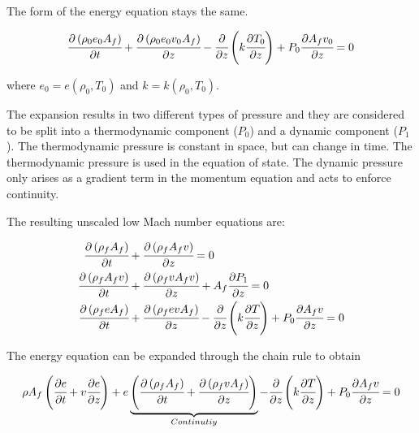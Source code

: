 \documentclass[../Article_Model_Parameters.tex]{subfiles}
\begin{document}
	The form of the energy equation stays the same. 
	
	{\footnotesize
		\begin{equation*}
			\cfrac{\partial \left( \rho_0 e_0 A_f \right) }{\partial t} + \cfrac{\partial \left( \rho_0 e_0 v_0 A_f \right)}{\partial z} - \cfrac{\partial}{\partial z} \left( k \cfrac{\partial T_0}{\partial z} \right) + P_0 \cfrac{\partial A_f v_0}{\partial z} = 0
		\end{equation*}
	}
	
	where $e_0 = e(\rho_0, T_0)$ and $k=k(\rho_0, T_0)$.
		
	The expansion results in two different types of pressure and they are considered to be split into a thermodynamic component ($P_0$) and a dynamic component ($P_1$). The thermodynamic pressure is constant in space, but can change in time. The thermodynamic pressure is used in the equation of state. The dynamic pressure only arises as a gradient term in the momentum equation and acts to enforce continuity.
	
	The resulting unscaled low Mach number equations are:
	
	{\footnotesize
		\begin{align*}
			\cfrac{\partial \left( \rho_f A_f \right)}{\partial t} &+ \cfrac{\partial \left( \rho_f A_f v \right)}{\partial z} = 0 \\
			\cfrac{\partial \left( \rho_f A_f v \right) }{\partial t}	&+ \cfrac{\partial \left( \rho_f v A_f v \right)}{\partial z} + A_f \cfrac{\partial P_1}{\partial z} = 0\\
			\cfrac{\partial \left( \rho_f e A_f \right) }{\partial t} &+ \cfrac{\partial \left( \rho_f e v A_f \right)}{\partial z} - \cfrac{\partial}{\partial z} \left( k \cfrac{\partial T}{\partial z} \right) + P_0 \cfrac{\partial A_f v}{\partial z} = 0
		\end{align*}
	}
	
	The energy equation can be expanded through the chain rule to obtain
	
	{\footnotesize
		\begin{equation*}
			 \rho A_f \left( \cfrac{\partial e }{\partial t} + v \cfrac{\partial e}{\partial z} \right) + e  \underbrace{ \left( \cfrac{\partial \left( \rho_f A_f \right) }{\partial t} + \cfrac{\partial \left( \rho_f v A_f \right)}{\partial z} \right) }_{Continutiy}  - \cfrac{\partial}{\partial z} \left( k \cfrac{\partial T}{\partial z} \right) + P_0 \cfrac{\partial A_f v}{\partial z} = 0
		\end{equation*}
	}
\end{document}
